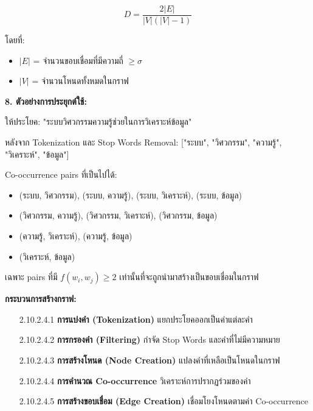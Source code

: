 \documentclass[12pt,a4paper]{article}
\begin{document}
\begin{enumerate}[leftmargin=2cm]
\begin{enumerate}
{\begin{enumerate}
            $$D = \frac{2|E|}{|V|(|V|-1)}$$

            โดยที่:
            \begin{itemize}
                \item $|E|$ = จำนวนขอบเชื่อมที่มีความถี่ $\geq \sigma$
                \item $|V|$ = จำนวนโหนดทั้งหมดในกราฟ
            \end{itemize}

            \vspace{5cm}

            \textbf{8. ตัวอย่างการประยุกต์ใช้:}

            ให้ประโยค: "ระบบวิศวกรรมความรู้ช่วยในการวิเคราะห์ข้อมูล"

            หลังจาก Tokenization และ Stop Words Removal: ["ระบบ", "วิศวกรรม", "ความรู้", "วิเคราะห์", "ข้อมูล"]

            Co-occurrence pairs ที่เป็นไปได้:
            \begin{itemize}
                \item (ระบบ, วิศวกรรม), (ระบบ, ความรู้), (ระบบ, วิเคราะห์), (ระบบ, ข้อมูล)
                \item (วิศวกรรม, ความรู้), (วิศวกรรม, วิเคราะห์), (วิศวกรรม, ข้อมูล)
                \item (ความรู้, วิเคราะห์), (ความรู้, ข้อมูล)
                \item (วิเคราะห์, ข้อมูล)
            \end{itemize}

            เฉพาะ pairs ที่มี $f(w_i, w_j) \geq 2$ เท่านั้นที่จะถูกนำมาสร้างเป็นขอบเชื่อมในกราฟ

            \textbf{กระบวนการสร้างกราฟ:}

            \begin{enumerate}
                \item[2.10.2.4.1] \textbf{การแบ่งคำ (Tokenization)} แยกประโยคออกเป็นคำแต่ละคำ
                \item[2.10.2.4.2] \textbf{การกรองคำ (Filtering)} กำจัด Stop Words และคำที่ไม่มีความหมาย
                \item[2.10.2.4.3] \textbf{การสร้างโหนด (Node Creation)} แปลงคำที่เหลือเป็นโหนดในกราฟ
                \item[2.10.2.4.4] \textbf{การคำนวณ Co-occurrence} วิเคราะห์การปรากฏร่วมของคำ
                \item[2.10.2.4.5] \textbf{การสร้างขอบเชื่อม (Edge Creation)} เชื่อมโยงโหนดตามค่า Co-occurrence
            \end{enumerate}


\end{enumerate}}
\end{enumerate}
\end{enumerate}
\end{document}
